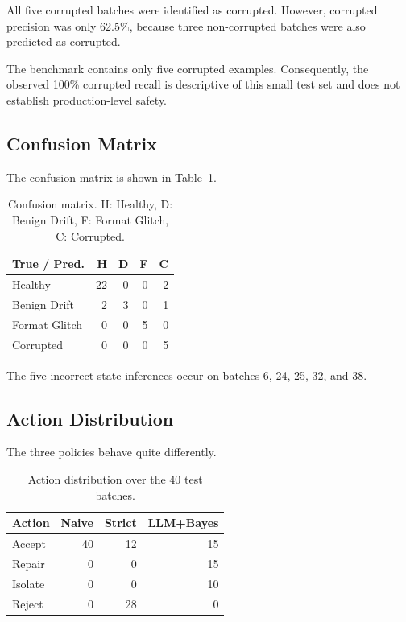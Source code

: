 \documentclass{article}
\begin{document}
All five corrupted batches were identified as corrupted. However, corrupted precision was only 62.5\%, because three non-corrupted batches were also predicted as corrupted.

The benchmark contains only five corrupted examples. Consequently, the observed 100\% corrupted recall is descriptive of this small test set and does not establish production-level safety.


\subsection{Confusion Matrix}

The confusion matrix is shown in Table~\ref{tab:confusion}.

\begin{table}[t]
\centering
\small
\begin{tabular}{lrrrr}
\toprule
True / Pred. & H & D & F & C \\
\midrule
Healthy       & 22 & 0 & 0 & 2 \\
Benign Drift  & 2 & 3 & 0 & 1 \\
Format Glitch & 0 & 0 & 5 & 0 \\
Corrupted     & 0 & 0 & 0 & 5 \\
\bottomrule
\end{tabular}
\caption{Confusion matrix. H: Healthy, D: Benign Drift, F: Format Glitch, C: Corrupted.}
\label{tab:confusion}
\end{table}

The five incorrect state inferences occur on batches 6, 24, 25, 32, and 38.


\subsection{Action Distribution}

The three policies behave quite differently.

\begin{table}[t]
\centering
\begin{tabular}{lrrr}
\toprule
Action & Naive & Strict & LLM+Bayes \\
\midrule
Accept  & 40 & 12 & 15 \\
Repair  & 0  & 0  & 15 \\
Isolate & 0  & 0  & 10 \\
Reject  & 0  & 28 & 0 \\
\bottomrule
\end{tabular}
\caption{Action distribution over the 40 test batches.}
\label{tab:actions}
\end{table}
\end{document}
